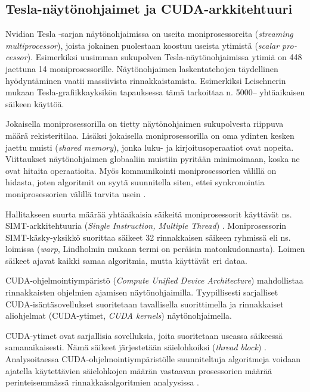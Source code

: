 \documentclass[a4paper,11pt]{article}
\newcommand{\engl}[1]{\foreignlanguage{english}{\em #1}}
\begin{document}
\subsection{Tesla-näytönohjaimet ja CUDA-arkkitehtuuri}

Nvidian Tesla -sarjan näytönohjaimissa on useita moniprosessoreita (\engl{streaming multiprocessor}), joista jokainen puolestaan koostuu useista ytimistä (\engl{scalar processor}). Esimerkiksi uusimman sukupolven Tes\-la-näy\-tön\-oh\-jai\-mis\-sa ytimiä on 448 jaettuna 14 moniprosessorille. Näytönohjaimen laskentatehojen täydellinen hyödyntäminen vaatii massiivista rinnakkaistamista. Esimerkiksi Leischnerin \cite{leischner2010} mukaan Tesla-gra\-fiik\-ka\-yk\-si\-kön tapauksessa tämä tarkoittaa n. 5000\thinspace-- yhtäaikaisen säikeen käyttöä.

Jokaisella moniprosessorilla on tietty näytönohjaimen sukupolvesta riippuva määrä rekisteritilaa. Lisäksi jokaisella moniprosessorilla on oma ydinten kesken jaettu muisti (\engl{shared memory}), jonka luku- ja kirjoitusoperaatiot ovat nopeita. Viittaukset näytönohjaimen globaaliin muistiin pyritään minimoimaan, koska ne ovat hitaita operaatioita. Myös kommunikointi moniprosessorien välillä on hidasta, joten algoritmit on syytä suunnitella siten, ettei synkronointia moniprosessorien välillä tarvita usein \cite{kolonias2011}.

Hallitakseen suurta määrää yhtäaikaisia säikeitä moniprosessorit käyttävät ns. SIMT-arkkitehtuuria (\engl{Single Instruction, Multiple Thread}) \cite{lindholm2008}. Moniprosessorin SIMT-käsky-yksikkö suorittaa säikeet 32 rinnakkaisen säikeen ryhmissä eli ns. loimissa (\engl{warp}, Lindholmin \cite{lindholm2008} mukaan termi on peräisin matonkudonnasta). Loimen säikeet ajavat kaikki samaa algoritmia, mutta käyttävät eri dataa.

CUDA-ohjelmointiympäristö (\engl{Compute Unified Device Architecture}) \cite{cudaprogramming} mahdollistaa rinnakkaisten ohjelmien ajamisen näytönohjaimilla. Tyypillisesti sarjalliset CUDA-isäntäsovellukset suoritetaan tavallisella suorittimella ja rinnakkaiset aliohjelmat (CUDA-ytimet, \engl{CUDA kernels}) näytönohjaimella.

CUDA-ytimet ovat sarjallisia sovelluksia, joita suoritetaan useassa säikeessä samanaikaisesti. Nämä säikeet järjestetään säielohkoiksi (\engl{thread block}) \cite{cudaprogramming}. Analysoitaessa CUDA-ohjelmointiympäristölle suunniteltuja algoritmeja voidaan ajatella käytettävien säielohkojen määrän vastaavan prosessorien määrää perinteisemmässä rinnakkaisalgoritmien analyysissa \cite{satish2009}.
\end{document}
